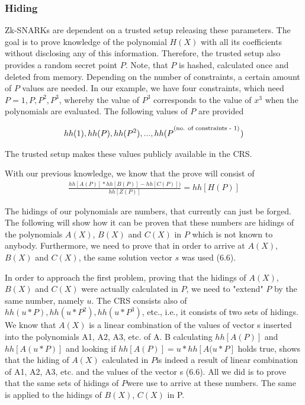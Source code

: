 \subsubsection{Hiding}
Zk-SNARKs are dependent on a trusted setup releasing these parameters. The goal is to prove knowledge of the polynomial \(H(X)\) with all its coefficients without disclosing any of this information. Therefore, the trusted setup also provides a random secret point \(P\). Note, that \(P\) is hashed, calculated once and deleted from memory. Depending on the number of constraints, a certain amount of \(P\) values are needed. In our example, we have four constraints, which need \(P = {1, P, P^2, P^3}\), whereby the value of \(P^3\) corresponds to the value of \(x^3\) when the polynomials are evaluated. The following values of \(P\) are provided

\begin{align}
    hh(1), hh(P), hh(P^2), ..., hh(P^\textsuperscript{(no. of constraints - 1)})
\end{align}

The trusted setup makes these values publicly available in the CRS.

With our previous knowledge, we know that the prove will consist of
\begin{align}
    \frac{hh[A(P)] * hh[B(P)] - hh[C(P)])}{hh[Z(P)]} = hh[H(P)]
\end{align}

The hidings of our polynomials are numbers, that currently can just be forged. The following will show how it can be proven that these numbers are hidings of the polynomials \(A(X)\), \(B(X)\) and \(C(X)\) in \(P\) which is not known to anybody. Furthermore, we need to prove that in order to arrive at \(A(X)\), \(B(X)\) and \(C(X)\), the same solution vector \(s\) was used (6.6). 

In order to approach the first problem, proving that the hidings of \(A(X)\),  \(B(X)\) and \(C(X)\) were actually calculated in \(P\), we need to "extend" \(P\) by the same number, namely \(u\). The CRS consists also of \(hh(u*P), hh(u*P^2), hh(u*P^3)\), etc., i.e., it consists of two sets of hidings. We know that \(A(X)\) is a linear combination of the values of vector s inserted into the polynomials A1, A2, A3, etc. of A. B calculating \(hh[A(P)]\) and \(hh[A(u*P)]\) and looking if \(hh[A(P)] = u * hh[A(u*P]\) holds true, shows that the hiding of \(A(X)\) calculated in \(P\)is indeed a result of linear combination of A1, A2, A3, etc. and the values of the vector s (6.6). All we did is to prove that the same sets of hidings of \(P\)were use to arrive at these numbers. The same is applied to the hidings of \(B(X)\), \(C(X)\) in P.

